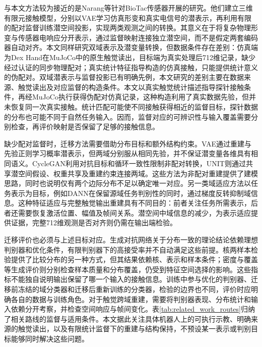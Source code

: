 与本文方法较为接近的是Narang等针对BioTac传感器开展的研究。他们建立三维有限元接触模型，分别以VAE学习仿真形变和真实电信号的潜表示，再利用有限的配对监督训练潜空间投影，实现两类观测之间的转换\cite{narang2021latentprojections}。其意义在于将复杂物理形变与传感器电响应分开表示，通过监督映射连接独立潜空间，而不是假定两套编码器自动对齐。本文同样研究双域表示及潜变量转换，但数据条件存在差别：仿真端为Dex Hand在MuJoCo中的原生触觉读出，目标端为真实处理后712维记录，缺少经过认证的同步物理配对；真实统计特征指导构造的仿真接触，只能提供统计意义的伪配对。双域潜表示与监督投影已有明确先例，本文研究的差别主要在数据来源、触觉读出及对应监督的构造条件。本文以真实触觉统计描述指导探针接触条件，再经MuJoCo执行获得伪配对仿真记录，这种构造利用了真实数据先验，但并未恢复同一次真实接触。统计匹配可能使不同接触获得相近的监督目标，探针数据的分布也可能不同于自然任务输入。因而，监督对应的可辨识性与输入覆盖需要分别检查，再评价映射是否保留了足够的接触信息。

缺少配对监督时，迁移方法需要借助分布目标和额外结构约束。VAE通过重建与先验正则学习概率潜表示，但两域分别服从相同先验，并不保证潜变量各维具有相同语义\cite{kingma2014vae}。CycleGAN利用对抗目标和循环一致性限制非配对转换，UNIT则通过共享潜空间假设、权重共享及重建约束连接两域\cite{zhu2017cyclegan,liu2017unit}。这些方法为非配对重建提供了建模思路，同时也说明仅有两个边际分布不足以确定唯一对应。另一类域适应方法以任务表示为目标，例如DANN在保留源域任务判别性的同时，通过梯度反转抑制域信息\cite{ganin2016dann}。这种特征适应与完整触觉输出重建具有不同目的：前者关注任务所需表示，后者还需要恢复激活位置、幅值及帧间关系。潜空间中域信息的减少，为表示适应提供证据，完整712维观测是否对齐则仍需在输出端检验。

迁移评价也必须与上述目标对应。生成对抗网络关于分布一致的理论结论依赖理想判别器和优化条件，有限判别器下的高接受率并不自动满足这些前提\cite{goodfellow2014gan}。核两样本检验提供了比较分布的另一种方式，但其结果依赖核、表示和样本条件\cite{gretton2012mmd}；密度与覆盖等生成评价则分别检查样本质量和分布覆盖，仍受到特征空间选择的影响\cite{naeem2020metrics}。这些指标不能独自说明输出保留了哪一个输入的接触信息。训练中参与优化的判别器、迁移前冻结的域分类器和迁移后重新训练的分类器，检验的边界也不同，评价时应明确各自的数据与训练角色。对于触觉跨域重建，需要将判别器表现、分布统计和输入依赖分开考察，并检查空间响应与帧间变化。表\ref{tab:related_work_routes}归纳了相关路线的监督与适用条件。本文据此关注具体机器人上的可执行示教、明确来源的触觉读出，以及有限统计监督下的重建与结构保持，不预设某一表示或判别目标能够同时解决这些问题。

